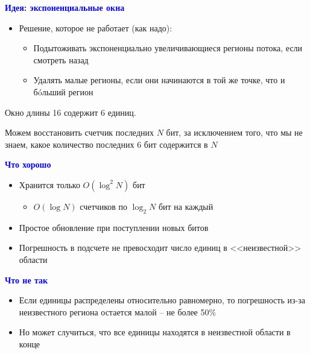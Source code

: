 \documentclass[landscape]{slides}
\begin{document}
\begin{normalsize}
\begin{slide}
\textbf{\textcolor{blue}{Идея: экспоненциальные окна}}


\begin{itemize}
\item Решение, которое не работает (как надо):

  \begin{itemize}
  \item Подытоживать экспоненциально увеличивающиеся регионы потока, если смотреть назад

  \item Удалять малые регионы, если они начинаются в той же точке, что и б\'oльший регион
  \end{itemize}
\end{itemize}

Окно длины 16 содержит 6 единиц.

Можем восстановить счетчик последних $N$ бит, за исключением того, что мы не знаем, какое количество последних 6 бит содержится в $N$
\end{slide}


\begin{slide}
\textbf{\textcolor{blue}{Что хорошо}}


\begin{itemize}
\item Хранится только $O(\log^2 N)$ бит

  \begin{itemize}
  \item $O(\log N)$ счетчиков по $\log_2 N$  бит на каждый
  \end{itemize}

\item Простое обновление при поступлении новых битов

\item Погрешность в подсчете не превосходит число единиц в <<неизвестной>> области
\end{itemize}
\end{slide}


\begin{slide}
\textbf{\textcolor{blue}{Что не так}}


\begin{itemize}
\item Если единицы распределены относительно равномерно, то погрешность из-за неизвестного региона остается малой -- не более 50\%

\item Но может случиться, что все единицы находятся в неизвестной области в конце


\end{itemize}
\end{slide}
\end{normalsize}
\end{document}
